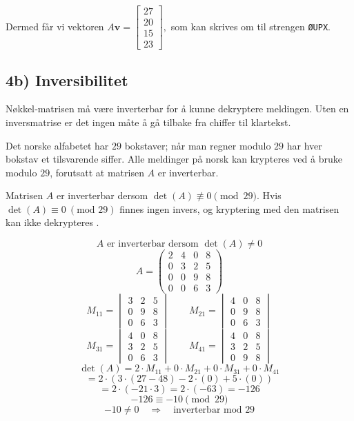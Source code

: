 \documentclass[12pt,a4paper]{article}
\begin{document}
Dermed får vi vektoren
$
A\mathbf{v}= \begin{bmatrix}27\\20\\15\\23\end{bmatrix},
$
som kan skrives om til strengen \texttt{ØUPX}.

\subsection{4b) Inversibilitet}
Nøkkel‑matrisen må være inverterbar for å kunne dekryptere meldingen.
Uten en inversmatrise er det ingen måte å gå tilbake fra chiffer til
klartekst.  

Det norske alfabetet har $29$ bokstaver; når man regner modulo $29$ har hver
bokstav et tilsvarende siffer. Alle meldinger på norsk kan krypteres ved å
bruke modulo $29$, forutsatt at matrisen $A$ er inverterbar.

Matrisen $A$ er inverterbar dersom
$
\det(A)\not\equiv 0 \pmod{29}.
$
Hvis $\det(A)\equiv0\ (\text{mod }29)$ finnes ingen invers, og kryptering med
den matrisen kan ikke dekrypteres \cite{minini2026}.

\[ A \text{ er inverterbar dersom }\det(A)\neq 0 \] \[ A= \begin{pmatrix} 2 & 4 & 0 & 8\\ 0 & 3 & 2 & 5\\ 0 & 0 & 9 & 8\\ 0 & 0 & 6 & 3 \end{pmatrix} \] \[ M_{11}= \begin{vmatrix} 3 & 2 & 5\\ 0 & 9 & 8\\ 0 & 6 & 3 \end{vmatrix} \qquad M_{21}= \begin{vmatrix} 4 & 0 & 8\\ 0 & 9 & 8\\ 0 & 6 & 3 \end{vmatrix} \] \[ M_{31}= \begin{vmatrix} 4 & 0 & 8\\ 3 & 2 & 5\\ 0 & 6 & 3 \end{vmatrix} \qquad M_{41}= \begin{vmatrix} 4 & 0 & 8\\ 3 & 2 & 5\\ 0 & 9 & 8 \end{vmatrix} \] \[ \det(A) = 2\cdot M_{11} + 0\cdot M_{21} + 0\cdot M_{31} + 0\cdot M_{41} \] \[ = 2\cdot \left( 3\cdot(27-48) - 2\cdot(0) + 5\cdot(0) \right) \] \[ = 2\cdot(-21\cdot3) = 2\cdot(-63) = -126 \] \[ -126 \equiv -10 \pmod{29} \] \[ -10 \neq 0 \quad\Rightarrow\quad \text{inverterbar mod }29 \]
\end{document}
